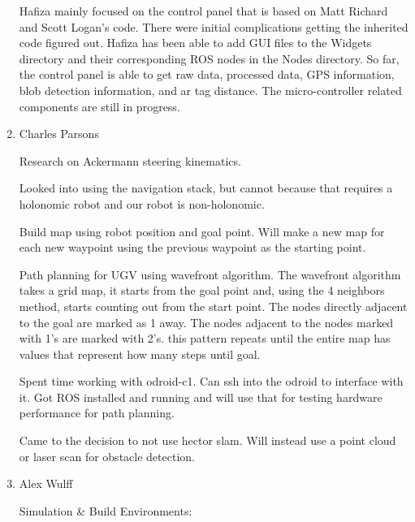 \begin{enumerate}
Hafiza mainly focused on the control panel that is based on Matt Richard and Scott Logan's code. There were initial complications getting the inherited code figured out. Hafiza has been able to add GUI files to the Widgets directory and their corresponding ROS nodes in the Nodes directory. So far, the control panel is able to get raw data, processed data, GPS information, blob detection information, and ar tag distance. The micro-controller related components are still in progress.

\item Charles Parsons

Research on Ackermann steering kinematics.

Looked into using the navigation stack, but cannot because that requires a holonomic robot and our robot is non-holonomic.

Build map using robot position and goal point. Will make a new map for each new waypoint using the previous waypoint as the starting point.

Path planning for UGV using wavefront algorithm. The wavefront algorithm takes a grid map, it starts from the goal point and, using the 4 neighbors method, starts counting out from the start point. The nodes directly adjacent to the goal are marked as 1 away. The nodes adjacent to the nodes marked with 1's are marked with 2's. this pattern repeats until the entire map has values that represent how many steps until goal.

Spent time working with odroid-c1. Can ssh into the odroid to interface with it. Got ROS installed and running and will use that for testing hardware performance for path planning.

Came to the decision to not use hector slam. Will instead use a point cloud or laser scan for obstacle detection.


\item Alex Wulff

Simulation \& Build Environments:


\end{enumerate}
